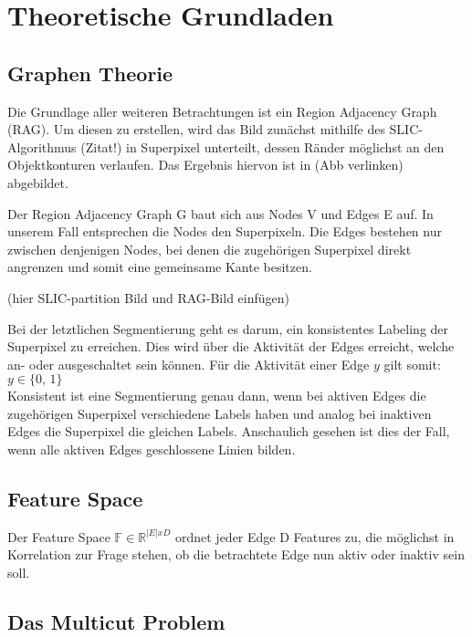 \chapter{Theoretische Grundladen}\label{ch:theoretischeGrundlagen}
\section{Graphen Theorie}\label{sec:graphTheory}

Die Grundlage aller weiteren Betrachtungen ist ein Region Adjacency Graph (RAG). Um diesen zu erstellen, wird das Bild zunächst mithilfe des SLIC-Algorithmus (Zitat!) in Superpixel unterteilt, dessen Ränder möglichst an den Objektkonturen verlaufen. Das Ergebnis hiervon ist in (Abb verlinken) abgebildet. 

Der Region Adjacency Graph G baut sich aus Nodes V und Edges E auf. In unserem Fall entsprechen die Nodes den Superpixeln. Die Edges bestehen nur zwischen denjenigen Nodes, bei denen die zugehörigen Superpixel direkt angrenzen und somit eine gemeinsame Kante besitzen. 

(hier SLIC-partition Bild und RAG-Bild einfügen)




Bei der letztlichen Segmentierung geht es darum, ein konsistentes Labeling der Superpixel zu erreichen. Dies wird über die Aktivität der Edges erreicht, welche an- oder ausgeschaltet sein können. Für die Aktivität einer Edge $y$ gilt somit: $y \in \{\text{0, 1}\}$ \\
Konsistent ist eine Segmentierung genau dann, wenn bei aktiven Edges die zugehörigen Superpixel verschiedene Labels haben und analog bei inaktiven Edges die Superpixel die gleichen Labels. Anschaulich gesehen ist dies der Fall, wenn alle aktiven Edges geschlossene Linien bilden.


\section{Feature Space}\label{sec:featureSpace}

Der Feature Space $\mathbb{F} \in \mathbb{R}^{|E|xD}$ ordnet jeder Edge D Features zu, die möglichst in Korrelation zur Frage stehen, ob die betrachtete Edge nun aktiv oder inaktiv sein soll. 



\section{Das Multicut Problem}\label{sec:multicutProb}

